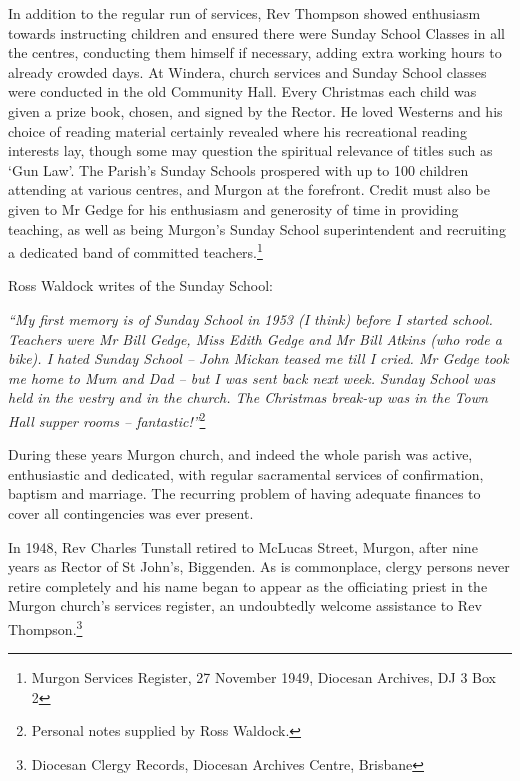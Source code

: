 In addition to the regular run of services, Rev Thompson showed enthusiasm towards instructing children and ensured there were Sunday School Classes in all the centres, conducting them himself if necessary, adding extra working hours to already crowded days. At Windera, church services and Sunday School classes were conducted in the old Community Hall. Every Christmas each child was given a prize book, chosen, and signed by the Rector. He loved Westerns and his choice of reading material certainly revealed where his recreational reading interests lay, though some may question the spiritual relevance of titles such as `Gun Law'. The Parish's Sunday Schools prospered with up to 100 children attending at various centres, and Murgon at the forefront. Credit must also be given to Mr Gedge for his enthusiasm and generosity of time in providing teaching, as well as being Murgon's Sunday School superintendent and recruiting a dedicated band of committed teachers.\footnote{Murgon Services Register, 27 November 1949, Diocesan Archives, DJ 3 Box 2}


Ross Waldock writes of the Sunday School:



\emph{``My first memory is of Sunday School in 1953 (I think) before I started school. Teachers were Mr Bill Gedge, Miss Edith Gedge and Mr Bill Atkins (who rode a bike). I hated Sunday School -- John Mickan teased me till I cried. Mr Gedge took me home to Mum and Dad -- but I was sent back next week. Sunday School was held in the vestry and in the church. The Christmas break-up was in the Town Hall supper rooms -- fantastic!''}\footnote{Personal notes supplied by Ross Waldock.}


\smallskip


During these years Murgon church, and indeed the whole parish was active, enthusiastic and dedicated, with regular sacramental services of confirmation, baptism and marriage. The recurring problem of having adequate finances to cover all contingencies was ever present.



In 1948, Rev Charles Tunstall retired to McLucas Street, Murgon, after nine years as Rector of St John's, Biggenden. As is commonplace, clergy persons never retire completely and his name began to appear as the officiating priest in the Murgon church's services register, an undoubtedly welcome assistance to Rev Thompson.\footnote{Diocesan Clergy Records, Diocesan Archives Centre, Brisbane}


